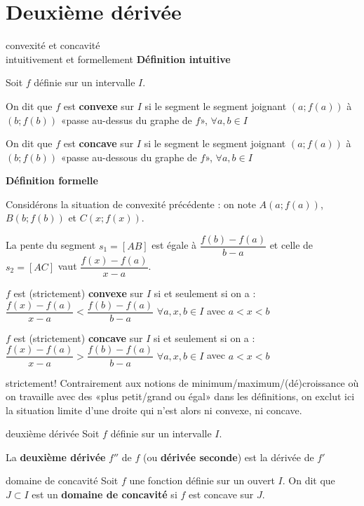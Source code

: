 \documentclass[a4paper,12pt]{article}
\begin{document}
\section{Deuxième dérivée}
\begin{definition}
	convexité et concavité\\
	intuitivement et formellement
	\tcblower
	{\bfseries Définition intuitive}

Soit $f$ définie sur un intervalle $I$.

On dit que $f$ est \textbf{convexe} sur $I$ si le segment le segment joignant $(a ;f(a))$ à $(b ;f(b))$ «passe au-dessus du graphe de $f$», $\forall a, b \in I$

On dit que $f$ est \textbf{concave} sur $I$ si le segment le segment joignant $(a ;f(a))$ à $(b ;f(b))$ «passe au-dessous du graphe de $f$», $\forall a, b \in I$

\textbf{Définition formelle}

Considérons la situation de convexité précédente : on note $A(a ;f(a))$, $B(b ;f(b))$ et $C(x ;f(x))$.

La pente du segment $s_1=[AB]$ est égale à $\dfrac{f(b) - f(a)}{b - a}$ et celle de $s_2=[AC]$ vaut $\dfrac{f(x) - f(a)}{x - a}$.

$f$ est (strictement) \textbf{convexe} sur $I$ si et seulement si on a :
$\dfrac{f(x) - f(a)}{x - a} < \dfrac{f(b) - f(a)}{b - a}$ $\forall a, x, b \in I$ avec $a < x < b$

$f$ est (strictement) \textbf{concave} sur $I$ si et seulement si on a :
$\dfrac{f(x) - f(a)}{x - a} > \dfrac{f(b) - f(a)}{b - a}$ $\forall a, x, b \in I$ avec $a < x < b$

\end{definition}

\begin{remarque}
	strictement!
	\tcblower
Contrairement aux notions de minimum/maximum/(dé)croissance où on travaille avec des «plus petit/grand ou égal» dans les définitions, on exclut ici la situation limite d'une droite qui n'est alors ni convexe, ni concave.
\end{remarque}

\begin{definition}
	deuxième dérivée
	\tcblower
Soit $f$ définie sur un intervalle $I$.

La \textbf{deuxième dérivée} $f''$ de $f$ (ou \textbf{dérivée seconde}) est la dérivée de $f'$
\end{definition}

\begin{definition}
	domaine de concavité
	\tcblower
	Soit $f$ une fonction définie sur un ouvert $I$. On dit que $J\subset I$ est un {\bfseries domaine de concavité} si $f$ est concave sur $J$. 
\end{definition}
\end{document}
